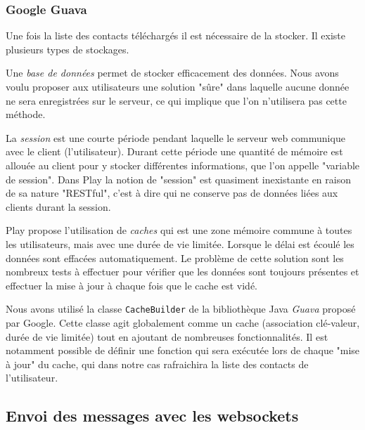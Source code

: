 \subsubsection{Google Guava}

Une fois la liste des contacts téléchargés il est nécessaire de la stocker.
Il existe plusieurs types de stockages.

Une \textit{base de données} permet de stocker efficacement des données.
Nous avons voulu proposer aux utilisateurs une solution "sûre" dans laquelle aucune donnée ne sera enregistrées sur le serveur, ce qui implique que l'on n'utilisera pas cette méthode.

La \textit{session} est une courte période pendant laquelle le serveur web communique avec le client (l'utilisateur).
Durant cette période une quantité de mémoire est allouée au client pour y stocker différentes informations, que l'on appelle "variable de session".
Dans Play la notion de "session" est quasiment inexistante en raison de sa nature "RESTful", c'est à dire qui ne conserve pas de données liées aux clients durant la session.

Play propose l'utilisation de \textit{caches} qui est une zone mémoire commune à toutes les utilisateurs, mais avec une durée de vie limitée.
Lorsque le délai est écoulé les données sont effacées automatiquement.
Le problème de cette solution sont les nombreux tests à effectuer pour vérifier que les données sont toujours présentes et effectuer la mise à jour à chaque fois que le cache est vidé.

Nous avons utilisé la classe \lstinline{CacheBuilder} de la bibliothèque Java \textit{Guava} proposé par Google.
Cette classe agit globalement comme un cache (association clé-valeur, durée de vie limitée) tout en ajoutant de nombreuses fonctionnalités.
Il est notamment possible de définir une fonction qui sera exécutée lors de chaque "mise à jour" du cache, qui dans notre cas rafraichira la liste des contacts de l'utilisateur.
\\



\subsection{Envoi des messages avec les websockets}



